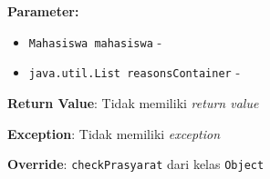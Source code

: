 \documentclass{article}
\begin{document}
\begin{enumerate}
\begin{itemize}
\textbf{Parameter:}
\begin{itemize}
\item \texttt{Mahasiswa mahasiswa} - 
\item \texttt{java.util.List reasonsContainer} - 
\end{itemize}
\textbf{Return Value}: Tidak memiliki \textit{return value}

\textbf{Exception}: Tidak memiliki \textit{exception}

\textbf{Override}: \texttt{checkPrasyarat} dari kelas \texttt{Object}

\end{itemize}
\end{enumerate}
\end{document}
